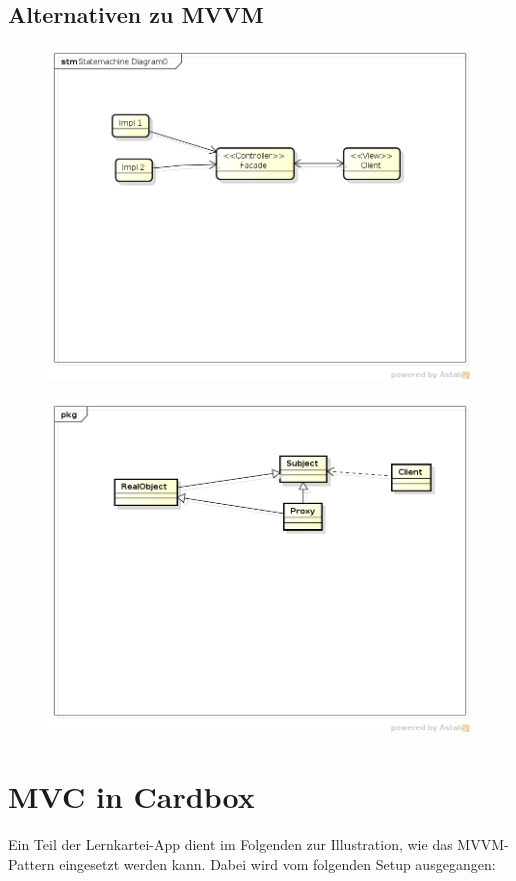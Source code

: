 \documentclass[a4paper,10pt]{scrreprt}
\begin{document}
\subsection{Alternativen zu MVVM}
\begin{figure}[h!]
 \centering
 \includegraphics[scale=.40]{./fpat.png}
\end{figure}
\begin{figure}[h!]
 \centering
 \includegraphics[scale=.40]{./proxy.png}
\end{figure}
\newpage
\section{MVC in Cardbox}
Ein Teil der Lernkartei-App dient im Folgenden zur Illustration, wie das MVVM-Pattern eingesetzt werden kann.
Dabei wird vom folgenden Setup ausgegangen:
\end{document}
